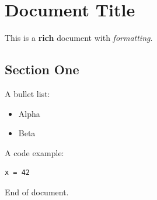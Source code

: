 \section{Document Title}
This is a \textbf{rich} document with \emph{formatting}.

\subsection{Section One}
A bullet list:

\begin{itemize}\item Alpha



\item Beta



\end{itemize}

A code example:

\begin{verbatim}
x = 42

\end{verbatim}
End of document.

